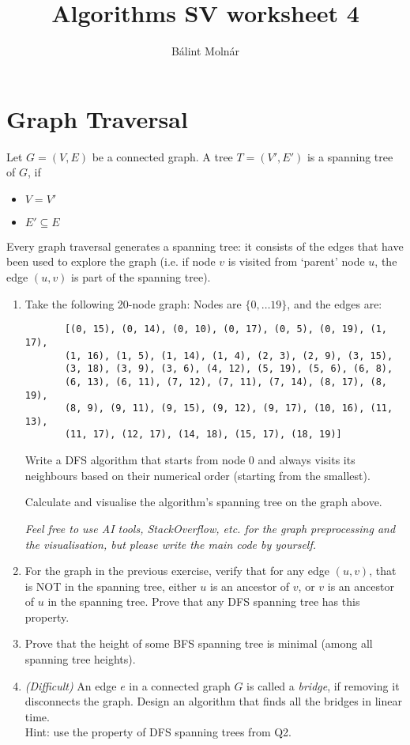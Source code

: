 \documentclass{article}
\title{{Algorithms SV worksheet 4}}
\author{Bálint Molnár}
\begin{document}
\maketitle


\section{Graph Traversal}

     Let $G=(V,E)$ be a connected graph. A tree $T=(V',E')$ is a spanning tree of $G$, if
    \begin{itemize}
        \item $V=V'$
        \item $E' \subseteq E$
    \end{itemize}


     Every graph traversal generates a spanning tree: it consists of the edges that have been used to explore the graph (i.e. if node $v$ is visited from `parent' node $u$, the edge $(u,v)$ is part of the spanning tree).
\begin{enumerate}
    \item
     
    

    
   Take the following 20-node graph: Nodes are $\{ 0,\dots 19\}$, and the edges are: 
   \begin{verbatim}
       [(0, 15), (0, 14), (0, 10), (0, 17), (0, 5), (0, 19), (1, 17),
       (1, 16), (1, 5), (1, 14), (1, 4), (2, 3), (2, 9), (3, 15),
       (3, 18), (3, 9), (3, 6), (4, 12), (5, 19), (5, 6), (6, 8),
       (6, 13), (6, 11), (7, 12), (7, 11), (7, 14), (8, 17), (8, 19),
       (8, 9), (9, 11), (9, 15), (9, 12), (9, 17), (10, 16), (11, 13),
       (11, 17), (12, 17), (14, 18), (15, 17), (18, 19)]
   \end{verbatim}

    Write a DFS algorithm that starts from node $0$ and always visits its neighbours based on their numerical order (starting from the smallest).

    Calculate and visualise the algorithm's spanning tree on the graph above.
   
    \emph{Feel free to use AI tools, StackOverflow, etc. for the graph preprocessing and the visualisation, but please write the main code by yourself.}
    \item For the graph in the previous exercise, verify that for any edge $(u,v)$, that is NOT in the spanning tree, either $u$ is an ancestor of $v$, or $v$ is an ancestor of $u$ in the spanning tree. Prove that any DFS spanning tree has this property.
    \item Prove that the height of \color{red}
        some
    \color{black} BFS spanning tree is minimal (among all spanning tree heights).
    \item \emph{(Difficult)} An edge $e$ in a connected graph $G$ is called a \emph{bridge}, if removing it disconnects the graph. Design an algorithm that finds all the bridges in linear time.\\ Hint: use the property of DFS spanning trees from Q2.
\end{enumerate}
\end{document}

